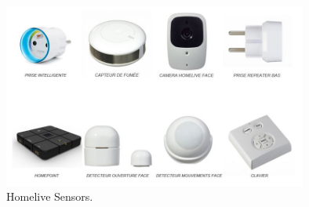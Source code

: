 \begin{figure}[htbp]
	\centering
		\includegraphics[width=10cm]{Figures/home-live_capteurs.jpg}
	\caption[Homelive Sensors]{Homelive Sensors.}%
	\label{fig:2}
\end{figure}
